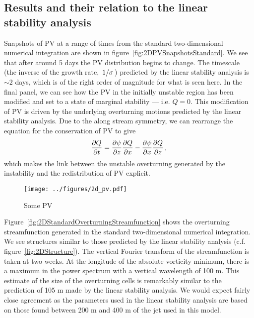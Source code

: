 \subsection{Results and their relation to the linear stability analysis}
Snapshots of PV at a range of times from the standard two-dimensional numerical integration are shown in figure~\ref{fig:2DPVSnapshotsStandard}. We see that after around 5 days the PV distribution begins to change. The timescale (the inverse of the growth rate, $\flatfrac{1}{\sigma}$) predicted by the linear stability analysis is $\sim 2$ days, which is of the right order of magnitude for what is seen here. In the final panel, we can see how the PV in the initially unstable region has been modified and set to a state of marginal stability --- i.e. $Q = 0$. This modification of PV is driven by the underlying overturning motions predicted by the linear stability analysis. Due to the along stream symmetry, we can rearrange the equation for the conservation of PV to give
\begin{equation}
    \label{eq:PVEvolution}
    \pdv{Q}{t} = \pdv{\psi}{z}\pdv{Q}{x} - \pdv{\psi}{x}\pdv{Q}{z} \, ,%
\end{equation}
which makes the link between the unstable overturning generated by the instability and the redistribution of PV explicit\footnotemark.

\begin{figure}
    \centering
    \texttt{[image: ../figures/2d\_pv.pdf]}
    \caption{Some PV}
\end{figure}


Figure~\ref{fig:2DStandardOverturningStreamfunction} shows the overturning streamfunction generated in the standard two-dimensional numerical integration. We see structures similar to those predicted by the linear stability analysis (c.f. figure~\ref{fig:2DStructure}). The vertical Fourier transform of the streamfunction is taken at two weeks. At the longitude of the absolute vorticity minimum, there is a maximum in the power spectrum with a vertical wavelength of 100 m. This estimate of the size of the overturning cells is remarkably similar to the prediction of 105 m made by the linear stability analysis. We would expect fairly close agreement as the parameters used in the linear stability analysis are based on those found between 200 m and 400 m of the jet used in this model.

